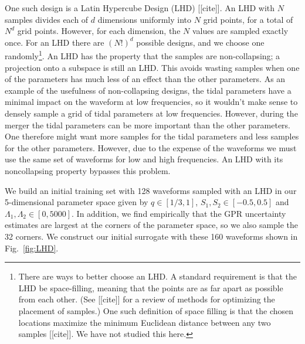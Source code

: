 \documentclass[prd,aps,letter,twocolumn,floatfix,notitlepage,nofootinbib]{revtex4-1}
\begin{document}
One such design is a Latin Hypercube Design (LHD) [[cite]]. An LHD with $N$ samples divides each of $d$ dimensions uniformly into $N$ grid points, for a total of $N^d$ grid points. However, for each dimension, the $N$ values are sampled exactly once. For an LHD there are $(N!)^d$ possible designs, and we choose one randomly\footnote{There are ways to better choose an LHD. A standard requirement is that the LHD be space-filling, meaning that the points are as far apart as possible from each other. (See [[cite]] for a review of methods for optimizing the placement of samples.) One such definition of space filling is that the chosen locations maximize the minimum Euclidean distance between any two samples [[cite]]. We have not studied this here.}. An LHD has the property that the samples are non-collapsing; a projection onto a subspace is still an LHD. This avoids wasting samples when one of the parameters has much less of an effect than the other parameters. As an example of the usefulness of non-collapsing designs, the tidal parameters have a minimal impact on the waveform at low frequencies, so it wouldn't make sense to densely sample a grid of tidal parameters at low frequencies. However, during the merger the tidal parameters can be more important than the other parameters. One therefore might want more samples for the tidal parameters and less samples for the other parameters. However, due to the expense of the waveforms we must use the same set of waveforms for low and high frequencies. An LHD with its noncollapsing property bypasses this problem. 

We build an initial training set with 128 waveforms sampled with an LHD in our 5-dimensional parameter space given by $q\in[1/3, 1]$, $S_1, S_2 \in [-0.5, 0.5]$ and $\Lambda_1, \Lambda_2 \in [0, 5000]$. In addition, we find empirically that the GPR uncertainty estimates are largest at the corners of the parameter space, so we also sample the 32 corners. We construct our initial surrogate with these 160 waveforms shown in Fig.~\ref{fig:LHD}.
\end{document}
